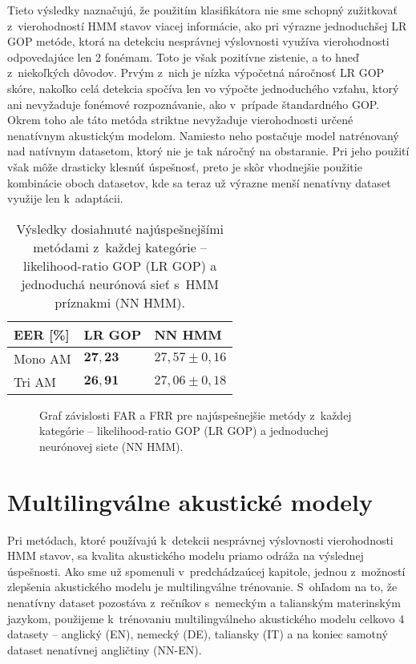 Tieto výsledky naznačujú, že použitím klasifikátora nie sme schopný zužitkovať z~vierohodností HMM stavov viacej informácie, ako pri výrazne jednoduchšej LR GOP metóde, ktorá na detekciu nesprávnej výslovnosti využíva vierohodnosti odpovedajúce len 2 fonémam. Toto je však pozitívne zistenie, a to hneď z~niekoľkých dôvodov. Prvým z~nich je nízka výpočetná náročnosť LR GOP skóre, nakoľko celá detekcia spočíva len vo výpočte jednoduchého vzťahu, ktorý ani nevyžaduje fonémové rozpoznávanie, ako v~prípade štandardného GOP. Okrem toho ale táto metóda striktne nevyžaduje vierohodnosti určené nenatívnym akustickým modelom. Namiesto neho postačuje model natrénovaný nad natívnym datasetom, ktorý nie je tak náročný na obstaranie. Pri jeho použití však môže drasticky klesnúť úspešnosť, preto je skôr vhodnejšie použitie kombinácie oboch datasetov, kde sa teraz už výrazne menší nenatívny dataset využije len k~adaptácii.

\begin{table}[h!]
    \centering
    \begin{tabular}{@{}lll@{}}
    \toprule
    EER {[}\%{]} & LR GOP  & NN HMM  \\ \midrule
    Mono AM      & $\bm{27{,}23}$ & $27{,}57 \pm 0{,}16$  \\
    Tri AM       & $\bm{26{,}91}$ & $27{,}06 \pm 0{,}18$  \\ \bottomrule
    \end{tabular}
    \caption{Výsledky dosiahnuté najúspešnejšími metódami z~každej kategórie -- likelihood-ratio GOP (LR GOP) a jednoduchá neurónová sieť s~HMM príznakmi (NN HMM).} \label{tab:eer-gop-vs-classifier}
    \end{table}

\begin{figure}[h!]
    \centering
    
    \caption{Graf závislosti FAR a FRR pre najúspešnejšie metódy z~každej kategórie -- likelihood-ratio GOP (LR GOP) a jednoduchej neurónovej siete (NN HMM).}
    \label{fig:roc-gop-vs-classifier}
\end{figure}


\section{Multilingválne akustické modely}

Pri metódach, ktoré používajú k~detekcii nesprávnej výslovnosti vierohodnosti HMM stavov, sa kvalita akustického modelu priamo odráža na výslednej úspešnosti. Ako sme už spomenuli v~predchádzaúcej kapitole, jednou z~možností zlepšenia akustického modelu je multilingválne trénovanie. S~ohľadom na to, že nenatívny dataset pozostáva z~rečníkov s~nemeckým a talianským materinským jazykom, použijeme k~trénovaniu multilingválneho akustického modelu celkovo 4 datasety -- anglický (EN), nemecký (DE), taliansky (IT) a na koniec samotný dataset nenatívnej angličtiny (NN-EN).

